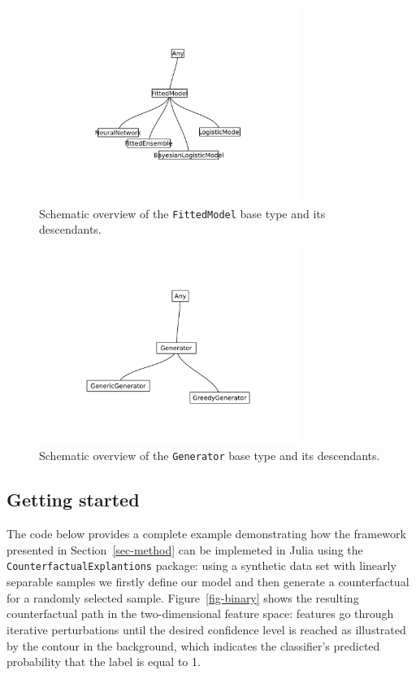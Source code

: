 \documentclass{juliacon}
\begin{document}
\begin{figure}

{\centering \includegraphics[width=3.33333in,height=2.5in]{www/models.png}

}

\caption{\label{fig-models}Schematic overview of the
\texttt{FittedModel} base type and its descendants.}

\end{figure}

\begin{figure}

{\centering \includegraphics[width=3.33333in,height=2.5in]{www/generators.png}

}

\caption{\label{fig-generators}Schematic overview of the
\texttt{Generator} base type and its descendants.}

\end{figure}

\hypertarget{sec-start}{%
\subsection{Getting started}\label{sec-start}}

The code below provides a complete example demonstrating how the
framework presented in Section~\ref{sec-method} can be implemeted in
Julia using the \texttt{CounterfactualExplantions} package: using a
synthetic data set with linearly separable samples we firstly define our
model and then generate a counterfactual for a randomly selected sample.
Figure~\ref{fig-binary} shows the resulting counterfactual path in the
two-dimensional feature space: features go through iterative
perturbations until the desired confidence level is reached as
illustrated by the contour in the background, which indicates the
classifier's predicted probability that the label is equal to 1.
\end{document}
